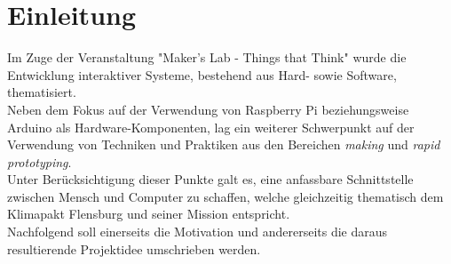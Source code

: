 \documentclass[.../Dokumentation.tex]{subfiles}
\begin{document}
\section{Einleitung}\label{sec-intr}
Im Zuge der Veranstaltung "Maker's Lab - Things that Think" wurde die 
Entwicklung interaktiver Systeme, bestehend aus Hard- sowie Software, 
thematisiert.\\
Neben dem Fokus auf der Verwendung von Raspberry Pi beziehungsweise Arduino als 
Hardware-Komponenten, lag ein weiterer Schwerpunkt auf der 
Verwendung von Techniken und Praktiken aus den Bereichen \textit{making} und 
\textit{rapid prototyping}.\\
Unter Berücksichtigung dieser Punkte galt es, eine \grqq anfassbare\grqq {} Schnittstelle 
zwischen Mensch und Computer zu schaffen, welche gleichzeitig thematisch dem 
Klimapakt Flensburg und seiner Mission entspricht.\\
Nachfolgend soll einerseits die Motivation und andererseits die daraus 
resultierende Projektidee umschrieben werden.
\end{document}
